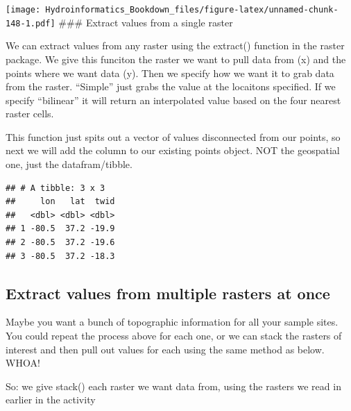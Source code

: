 \documentclass[
]{book}
\newenvironment{Shaded}{\begin{snugshade}}{\end{snugshade}}
\newcommand{\AttributeTok}[1]{\textcolor[rgb]{0.77,0.63,0.00}{#1}}
\newcommand{\CommentTok}[1]{\textcolor[rgb]{0.56,0.35,0.01}{\textit{#1}}}
\newcommand{\FunctionTok}[1]{\textcolor[rgb]{0.00,0.00,0.00}{#1}}
\newcommand{\NormalTok}[1]{#1}
\newcommand{\OtherTok}[1]{\textcolor[rgb]{0.56,0.35,0.01}{#1}}
\newcommand{\SpecialCharTok}[1]{\textcolor[rgb]{0.00,0.00,0.00}{#1}}
\newcommand{\StringTok}[1]{\textcolor[rgb]{0.31,0.60,0.02}{#1}}
\begin{document}
\texttt{[image: Hydroinformatics\_Bookdown\_files/figure-latex/unnamed-chunk-148-1.pdf]}
\#\#\# Extract values from a single raster

We can extract values from any raster using the extract() function in the raster package. We give this funciton the raster we want to pull data from (x) and the points where we want data (y). Then we specify how we want it to grab data from the raster. ``Simple'' just grabs the value at the locaitons specified. If we specify ``bilinear'' it will return an interpolated value based on the four nearest raster cells.

This function just spits out a vector of values disconnected from our points, so next we will add the column to our existing points object. NOT the geospatial one, just the datafram/tibble.

\begin{Shaded}
\end{Shaded}

\begin{verbatim}
## # A tibble: 3 x 3
##     lon   lat  twid
##   <dbl> <dbl> <dbl>
## 1 -80.5  37.2 -19.9
## 2 -80.5  37.2 -19.6
## 3 -80.5  37.2 -18.3
\end{verbatim}

\hypertarget{extract-values-from-multiple-rasters-at-once}{%
\subsection{Extract values from multiple rasters at once}\label{extract-values-from-multiple-rasters-at-once}}

Maybe you want a bunch of topographic information for all your sample sites. You could repeat the process above for each one, or we can stack the rasters of interest and then pull out values for each using the same method as below. WHOA!

So: we give stack() each raster we want data from, using the rasters we read in earlier in the activity
\end{document}
